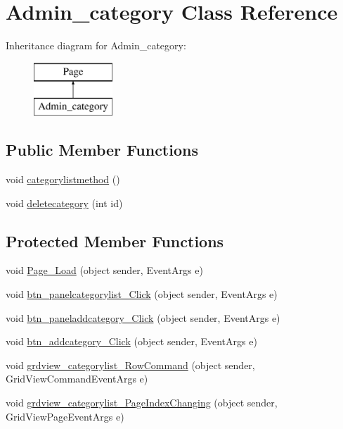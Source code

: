 \hypertarget{class_admin__category}{}\section{Admin\+\_\+category Class Reference}
\label{class_admin__category}
Inheritance diagram for Admin\+\_\+category\+:\begin{figure}[H]
\begin{center}
\leavevmode
\includegraphics[height=2.000000cm]{class_admin__category}
\end{center}
\end{figure}
\subsection*{Public Member Functions}
\begin{DoxyCompactItemize}
\item 
void \mbox{\hyperlink{class_admin__category_ac20520a3983225416920d8a822b12386}{categorylistmethod}} ()
\item 
void \mbox{\hyperlink{class_admin__category_aa67d61aa22585a29f541ac1e415e7501}{deletecategory}} (int id)
\end{DoxyCompactItemize}
\subsection*{Protected Member Functions}
\begin{DoxyCompactItemize}
\item 
void \mbox{\hyperlink{class_admin__category_aab4da6d83c0ea2ac289680b813bf7659}{Page\+\_\+\+Load}} (object sender, Event\+Args e)
\item 
void \mbox{\hyperlink{class_admin__category_afbfdc3845d88dc262c542b3406ea435b}{btn\+\_\+panelcategorylist\+\_\+\+Click}} (object sender, Event\+Args e)
\item 
void \mbox{\hyperlink{class_admin__category_aeff89af6ccbcbc3b10748c1ced664fb2}{btn\+\_\+paneladdcategory\+\_\+\+Click}} (object sender, Event\+Args e)
\item 
void \mbox{\hyperlink{class_admin__category_a7384f0480f3b6bd3e36e57da93d902f3}{btn\+\_\+addcategory\+\_\+\+Click}} (object sender, Event\+Args e)
\item 
void \mbox{\hyperlink{class_admin__category_a470bfbac64460f46d6dae4625cbe8a51}{grdview\+\_\+categorylist\+\_\+\+Row\+Command}} (object sender, Grid\+View\+Command\+Event\+Args e)
\item 
void \mbox{\hyperlink{class_admin__category_a94cb00b2f6d8a76a8e7c594f0f28fd90}{grdview\+\_\+categorylist\+\_\+\+Page\+Index\+Changing}} (object sender, Grid\+View\+Page\+Event\+Args e)
\end{DoxyCompactItemize}
